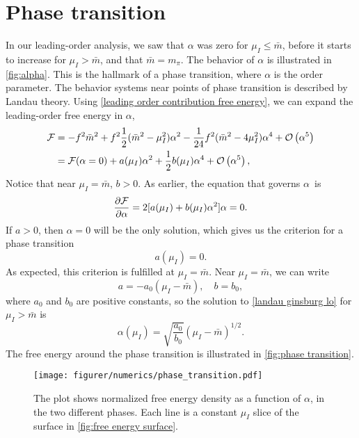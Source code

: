 \section{Phase transition}

In our leading-order analysis, we saw that $\alpha$ was zero for $\mu_I \leq \bar m$, before it starts to increase for $\mu_I>\bar m$, and that $\bar m = m_\pi$.
The behavior of $\alpha$ is illustrated in \autoref{fig:alpha}.
This is the hallmark of a phase transition, where $\alpha$ is the order parameter.
The behavior systems near points of phase transition is described by Landau theory.
Using \cref{leading order contribution free energy}, we can expand the leading-order free energy in $\alpha$,
\begin{align}
    \Ef
    & = -f^2 \bar m^2 + f^2 \frac{1}{2}(\bar m^2 - \mu_I^2)\alpha^2
    - \frac{1}{24} f^2 (\bar m^2 - 4 \mu_I^2) \alpha^4 + \Oh[5]{\alpha} \\
    & = \Ef(\alpha=0) + a(\mu_I)\alpha^2 + \frac{1}{2} b(\mu_I)\alpha^4 + \Oh[5]{\alpha},
\end{align}
Notice that near $\mu_I = \bar m$, $b > 0$.
As earlier, the equation that governs $\alpha$ is
\begin{equation}
    \label{landau ginsburg lo}
    \diffp{\Ef}{\alpha} = 2 [a(\mu_I) + b(\mu_I) \alpha^2] \alpha = 0.
\end{equation}
If $a>0$, then $\alpha = 0$ will be the only solution, which gives us the criterion for a phase transition 
\begin{equation}
    a(\mu_I) = 0.
\end{equation}
As expected, this criterion is fulfilled at $\mu_I = \bar m$.
Near $\mu_I = \bar m$, we can write
\begin{equation}
    a = - a_0 (\mu_I - \bar m), \quad b = b_0,
\end{equation}
where $a_0$ and $b_0$ are positive constants, so the solution to \cref{landau ginsburg lo} for $\mu_I>\bar m$ is
\begin{equation}
    \alpha(\mu_I) = \sqrt{\frac{a_0}{b_0}} (\mu_I - \bar m)^{1/2}.
\end{equation}
The free energy around the phase transition is illustrated in \autoref{fig:phase transition}.
\begin{figure}[h]
    \centering
    \texttt{[image: figurer/numerics/phase\_transition.pdf]}
    \caption{The plot shows normalized free energy density as a function of $\alpha$, in the two different phases. Each line is a constant $\mu_I$ slice of the surface in \autoref{fig:free energy surface}.}
    \label{fig:phase transition}
\end{figure}

